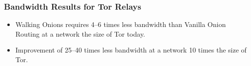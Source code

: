 \documentclass[hyperref={pdfpagelabels=true},table,dvipsnames,14pt,aspectratio=169]{beamer}
\begin{document}
\begin{frame}
\frametitle{Bandwidth Results for Tor Relays}

\begin{center}
  \hspace{-1.7cm}
  \begin{minipage}[t] {0.45\linewidth}
    \vspace*{8em}
  \end{minipage}
  \hspace{0.6cm}
  \begin{minipage}[t] {0.45\linewidth}
    \vspace*{8em}
  \end{minipage}
\end{center}

  \small
  \begin{itemize}
    \item<2-> Walking Onions requires 4--6 times less bandwidth
      than Vanilla Onion Routing at a network the size of Tor today.
    \item<3> Improvement of 25--40 times less bandwidth at a network
    10 times
      the size of Tor.
  \end{itemize}
\end{frame}
\end{document}
